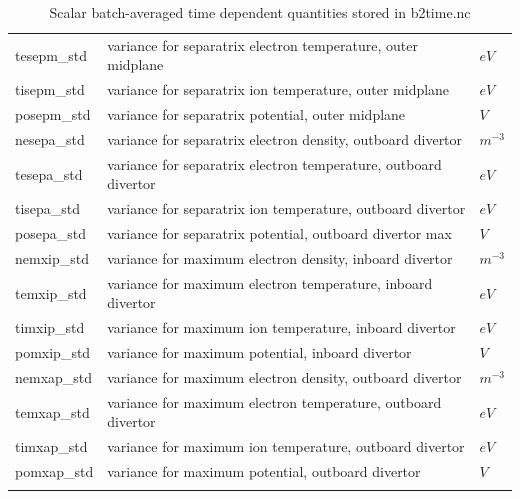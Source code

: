 \documentclass[a4paper,10pt]{report}
\begin{document}
\begin{center}
\begin{longtable}{|l|l|l|}
tesepm\_std \index{tesepm\_std}\index{b2time.nc, tesepm\_std} & variance for separatrix electron temperature, outer midplane & $eV$ \\
tisepm\_std \index{tisepm\_std}\index{b2time.nc, tisepm\_std} & variance for separatrix ion temperature, outer midplane & $eV$ \\
posepm\_std \index{posepm\_std}\index{b2time.nc, posepm\_std} & variance for separatrix potential, outer midplane & $V $ \\
nesepa\_std \index{nesepa\_std}\index{b2time.nc, nesepa\_std} & variance for separatrix electron density, outboard divertor & $m^{-3}$ \\
tesepa\_std \index{tesepa\_std}\index{b2time.nc, tesepa\_std} & variance for separatrix electron temperature, outboard divertor & $eV$ \\
tisepa\_std \index{tisepa\_std}\index{b2time.nc, tisepa\_std} & variance for separatrix ion temperature, outboard divertor & $eV$ \\
posepa\_std \index{posepa\_std}\index{b2time.nc, posepa\_std} & variance for separatrix potential, outboard divertor max & $V $ \\
nemxip\_std \index{nemxip\_std}\index{b2time.nc, nemxip\_std} & variance for maximum electron density, inboard divertor & $m^{-3}$ \\
temxip\_std \index{temxip\_std}\index{b2time.nc, temxip\_std} & variance for maximum electron temperature, inboard divertor & $eV$ \\
timxip\_std \index{timxip\_std}\index{b2time.nc, timxip\_std} & variance for maximum ion temperature, inboard divertor & $eV$ \\
pomxip\_std \index{pomxip\_std}\index{b2time.nc, pomxip\_std} & variance for maximum potential, inboard divertor & $V $ \\
nemxap\_std \index{nemxap\_std}\index{b2time.nc, nemxap\_std} & variance for maximum electron density, outboard divertor & $m^{-3}$ \\
temxap\_std \index{temxap\_std}\index{b2time.nc, temxap\_std} & variance for maximum electron temperature, outboard divertor & $eV$ \\
timxap\_std \index{timxap\_std}\index{b2time.nc, timxap\_std} & variance for maximum ion temperature, outboard divertor  & $eV$ \\
pomxap\_std \index{pomxap\_std}\index{b2time.nc, pomxap\_std} & variance for maximum potential, outboard divertor & $V $ \\
    \hline
    \caption{Scalar batch-averaged time dependent quantities stored in b2time.nc}
    \label{tab:b2timeav}
  \end{longtable}
\end{center}
\end{document}
